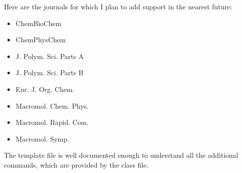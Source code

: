 Here are the journals for which I plan to add support in the nearest future:
\begin{itemize}
    \item ChemBioChem
    \item ChemPhysChem
    \item J. Polym. Sci. Parts A
    \item J. Polym. Sci. Parts B
    \item Eur. J. Org. Chem.
    \item Macromol. Chem. Phys.
    \item Macromol. Rapid. Com.
    \item Macromol. Symp.
\end{itemize}

The template file is well documented enough to understand all the additional
commands, which are provided by the class file.





